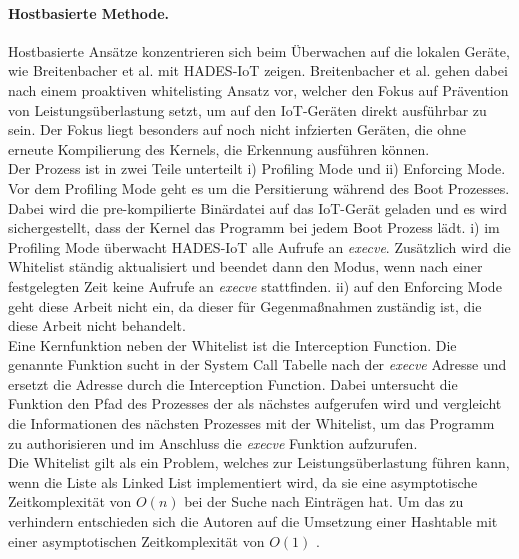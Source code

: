 \paragraph{Hostbasierte Methode.} Hostbasierte Ansätze konzentrieren sich beim Überwachen auf die lokalen Geräte, wie Breitenbacher et al. \cite{DBLP:journals/corr/abs-1905-01027} mit HADES-IoT zeigen. Breitenbacher et al. gehen dabei nach einem proaktiven whitelisting Ansatz vor, welcher den Fokus auf Prävention von Leistungsüberlastung setzt, um auf den IoT-Geräten direkt ausführbar zu sein. Der Fokus liegt besonders auf noch nicht infzierten Geräten, die ohne erneute Kompilierung des Kernels, die Erkennung ausführen können. \\
Der Prozess ist in zwei Teile unterteilt i) Profiling Mode und ii) Enforcing Mode. Vor dem Profiling Mode geht es um die Persitierung während des Boot Prozesses. Dabei wird die pre-kompilierte Binärdatei auf das IoT-Gerät geladen und es wird sichergestellt, dass der Kernel das Programm bei jedem Boot Prozess lädt. i) im Profiling Mode überwacht HADES-IoT alle Aufrufe an \textit{execve}. Zusätzlich wird die Whitelist ständig aktualisiert und beendet dann den Modus, wenn nach einer festgelegten Zeit keine Aufrufe an \textit{execve} stattfinden. ii) auf den Enforcing Mode geht diese Arbeit nicht ein, da dieser für Gegenmaßnahmen zuständig ist, die diese Arbeit nicht behandelt. \\ 
Eine Kernfunktion neben der Whitelist ist die Interception Function. Die genannte Funktion sucht in der System Call Tabelle nach der \textit{execve} Adresse und ersetzt die Adresse durch die Interception Function. Dabei untersucht die Funktion den Pfad des Prozesses der als nächstes aufgerufen wird und vergleicht die Informationen des nächsten Prozesses mit der Whitelist, um das Programm zu authorisieren und im Anschluss die \textit{execve} Funktion aufzurufen. \\ 
Die Whitelist gilt als ein Problem, welches zur Leistungsüberlastung führen kann, wenn die Liste als Linked List implementiert wird, da sie eine asymptotische Zeitkomplexität von $O(n)$ bei der Suche nach Einträgen hat. Um das zu verhindern entschieden sich die Autoren auf die Umsetzung einer Hashtable mit einer asymptotischen Zeitkomplexität von $O(1)$ \cite{huang2003efficient}.

